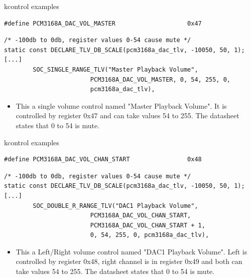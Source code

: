 \begin{frame}[fragile]{kcontrol examples}
  \begin{block}{}
    \fontsize{9}{9}\selectfont
    \begin{verbatim}
#define PCM3168A_DAC_VOL_MASTER                    0x47
    \end{verbatim}
  \end{block}
  \begin{block}{}
    \fontsize{9}{9}\selectfont
    \begin{verbatim}
/* -100db to 0db, register values 0-54 cause mute */
static const DECLARE_TLV_DB_SCALE(pcm3168a_dac_tlv, -10050, 50, 1);
[...]
        SOC_SINGLE_RANGE_TLV("Master Playback Volume",
                        PCM3168A_DAC_VOL_MASTER, 0, 54, 255, 0,
                        pcm3168a_dac_tlv),
    \end{verbatim}
  \end{block}
  \begin{itemize}
  \item This a single volume control named "Master Playback Volume".
    It is controlled by register 0x47 and can take values 54 to 255.
    The datasheet states that 0 to 54 is mute.
  \end{itemize}
\end{frame}

\begin{frame}[fragile]{kcontrol examples}
  \begin{block}{}
    \fontsize{9}{9}\selectfont
    \begin{verbatim}
#define PCM3168A_DAC_VOL_CHAN_START                0x48
    \end{verbatim}
  \end{block}
  \begin{block}{}
    \fontsize{9}{9}\selectfont
    \begin{verbatim}
/* -100db to 0db, register values 0-54 cause mute */
static const DECLARE_TLV_DB_SCALE(pcm3168a_dac_tlv, -10050, 50, 1);
[...]
        SOC_DOUBLE_R_RANGE_TLV("DAC1 Playback Volume",
                        PCM3168A_DAC_VOL_CHAN_START,
                        PCM3168A_DAC_VOL_CHAN_START + 1,
                        0, 54, 255, 0, pcm3168a_dac_tlv),
    \end{verbatim}
  \end{block}
  \begin{itemize}
  \item This a Left/Right volume control named "DAC1 Playback Volume".
    Left is controlled by register 0x48, right channel is in register
    0x49 and both can take values 54 to 255.
    The datasheet states that 0 to 54 is mute.
  \end{itemize}
\end{frame}

